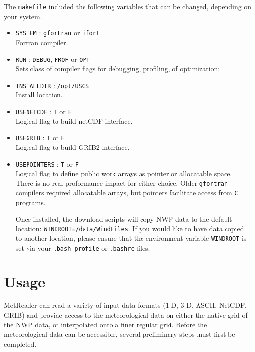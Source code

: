 \documentclass[11pt]{article}   %
\begin{document}
The \texttt{makefile} included the following variables that can be changed, depending on your
system.
\begin{itemize}
\item \texttt{SYSTEM} : \texttt{gfortran} or \texttt{ifort}\\
Fortran compiler.
\item \texttt{RUN} : \texttt{DEBUG}, \texttt{PROF} or \texttt{OPT}\\
Sets class of compiler flags for debugging, profiling, of optimization:
\item \texttt{INSTALLDIR} : \texttt{/opt/USGS} \\
Install location.
\item \texttt{USENETCDF} : \texttt{T} or \texttt{F}\\
Logical flag to build netCDF interface.
\item \texttt{USEGRIB} : \texttt{T} or \texttt{F}\\
Logical flag to build GRIB2 interface.
\item \texttt{USEPOINTERS} : \texttt{T} or \texttt{F}\\
Logical flag to define public work arrays as pointer or allocatable space. There is no
real proformance impact for either choice. Older \texttt{gfortran} compilers
required allocatable arrays, but pointers facilitate access from \texttt{C} programs.

Once installed, the download scripts will copy NWP data to the default location:
\texttt{WINDROOT=/data/WindFiles}.  If you would like to have data copied to another
location, please ensure that the environment variable \texttt{WINDROOT} is set via
your \texttt{.bash\_profile} or \texttt{.bashrc} files.
\end{itemize}

\clearpage
\section{Usage}
MetReader can read a variety of input data formats (1-D, 3-D, ASCII, NetCDF, GRIB) and
provide access to the meteorological data on either the native grid of the NWP data, or interpolated
onto a finer regular grid.  Before the meteorological data can be accessible, several preliminary steps
must first be completed.
\end{document}
